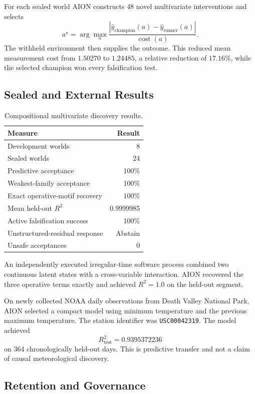 For each sealed world AION constructs 48 novel multivariate interventions and
selects
\[
a^\star
=
\arg\max_a
\frac{
\left|\hat y_{\mathrm{champion}}(a)
-\hat y_{\mathrm{runner}}(a)\right|
}{
\operatorname{cost}(a)
}.
\]
The withheld environment then supplies the outcome. This reduced mean
measurement cost from \(1.50270\) to \(1.24485\), a relative reduction of
\(17.16\%\), while the selected champion won every falsification test.

\subsection{Sealed and External Results}

\begin{table}[htbp]
\centering
\begin{tabular}{lr}
\hline
\textbf{Measure} & \textbf{Result}\\
\hline
Development worlds & 8\\
Sealed worlds & 24\\
Predictive acceptance & 100\%\\
Weakest-family acceptance & 100\%\\
Exact operative-motif recovery & 100\%\\
Mean held-out \(R^2\) & 0.9999985\\
Active falsification success & 100\%\\
Unstructured-residual response & Abstain\\
Unsafe acceptances & 0\\
\hline
\end{tabular}
\caption{Compositional multivariate discovery results.}
\end{table}

An independently executed irregular-time software process combined two
continuous latent states with a cross-variable interaction. AION recovered the
three operative terms exactly and achieved \(R^2=1.0\) on the held-out segment.

On newly collected NOAA daily observations from Death Valley National Park,
AION selected a compact model using minimum temperature and the previous
maximum temperature. The station identifier was \texttt{USC00042319}. The
model achieved
\[
R^2_{\mathrm{test}}=0.9395372236
\]
on 364 chronologically held-out days. This is predictive transfer and not a
claim of causal meteorological discovery.

\subsection{Retention and Governance}

